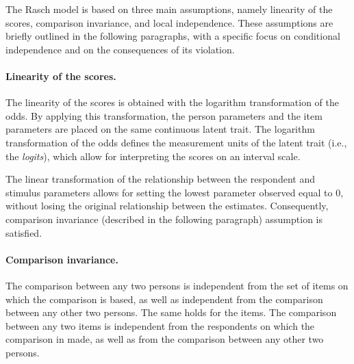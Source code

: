 \documentclass[12pt]{book}
\begin{document}


The Rasch model is based on three main assumptions, namely linearity of the scores, comparison invariance, and local independence. These assumptions are briefly outlined in the following paragraphs, with a specific focus on conditional independence and on the consequences of its violation. 

\paragraph{Linearity of the scores.}
The linearity of the scores is obtained with the logarithm transformation of the odds. By applying this transformation, the person parameters and the item parameters are placed on the same continuous latent trait. The logarithm transformation of the odds defines the measurement units of the latent trait (i.e., the \emph{logits}), which allow for interpreting the scores on an interval scale.

The linear transformation of the relationship between the respondent and stimulus parameters allows for setting the lowest parameter observed equal to 0, without losing the original relationship between the estimates. Consequently, comparison invariance (described in the following paragraph) assumption is satisfied.

\paragraph{Comparison invariance.}
The comparison between any two persons is independent from the set of items on which the comparison is based, as well as independent from the comparison between any other two persons. 
The same holds for the items. The comparison between any two items is independent from the respondents on which the comparison in made, as well as from the comparison between any other two persons.
\end{document}
